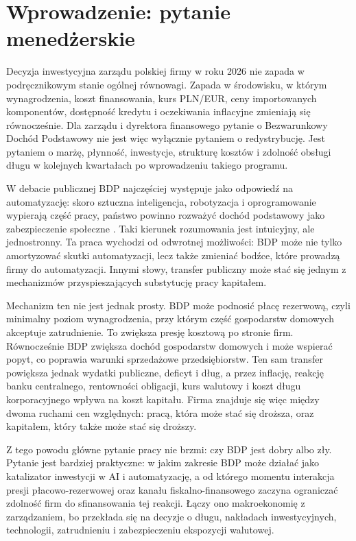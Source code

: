 \section{Wprowadzenie: pytanie menedżerskie}

Decyzja inwestycyjna zarządu polskiej firmy w roku 2026 nie zapada w podręcznikowym stanie ogólnej równowagi. Zapada w środowisku, w którym wynagrodzenia, koszt finansowania, kurs PLN/EUR, ceny importowanych komponentów, dostępność kredytu i oczekiwania inflacyjne zmieniają się równocześnie. Dla zarządu i dyrektora finansowego pytanie o Bezwarunkowy Dochód Podstawowy nie jest więc wyłącznie pytaniem o redystrybucję. Jest pytaniem o marżę, płynność, inwestycje, strukturę kosztów i zdolność obsługi długu w kolejnych kwartałach po wprowadzeniu takiego programu.

W debacie publicznej BDP najczęściej występuje jako odpowiedź na automatyzację: skoro sztuczna inteligencja, robotyzacja i oprogramowanie wypierają część pracy, państwo powinno rozważyć dochód podstawowy jako zabezpieczenie społeczne \parencite{autor2015,brynjolfsson2014,acemoglu2018,acemoglu2020,graetzMichaels2018,freyOsborne2017,korinekStiglitz2019,susskind2020}. Taki kierunek rozumowania jest intuicyjny, ale jednostronny. Ta praca wychodzi od odwrotnej możliwości: BDP może nie tylko amortyzować skutki automatyzacji, lecz także zmieniać bodźce, które prowadzą firmy do automatyzacji. Innymi słowy, transfer publiczny może stać się jednym z mechanizmów przyspieszających substytucję pracy kapitałem.

Mechanizm ten nie jest jednak prosty. BDP może podnosić płacę rezerwową, czyli minimalny poziom wynagrodzenia, przy którym część gospodarstw domowych akceptuje zatrudnienie. To zwiększa presję kosztową po stronie firm. Równocześnie BDP zwiększa dochód gospodarstw domowych i może wspierać popyt, co poprawia warunki sprzedażowe przedsiębiorstw. Ten sam transfer powiększa jednak wydatki publiczne, deficyt i dług, a przez inflację, reakcję banku centralnego, rentowności obligacji, kurs walutowy i koszt długu korporacyjnego wpływa na koszt kapitału. Firma znajduje się więc między dwoma ruchami cen względnych: pracą, która może stać się droższa, oraz kapitałem, który także może stać się droższy.

Z tego powodu główne pytanie pracy nie brzmi: czy BDP jest dobry albo zły. Pytanie jest bardziej praktyczne: w jakim zakresie BDP może działać jako katalizator inwestycji w AI i automatyzację, a od którego momentu interakcja presji płacowo-rezerwowej oraz kanału fiskalno-finansowego zaczyna ograniczać zdolność firm do sfinansowania tej reakcji. Łączy ono makroekonomię z zarządzaniem, bo przekłada się na decyzje o długu, nakładach inwestycyjnych, technologii, zatrudnieniu i zabezpieczeniu ekspozycji walutowej.

